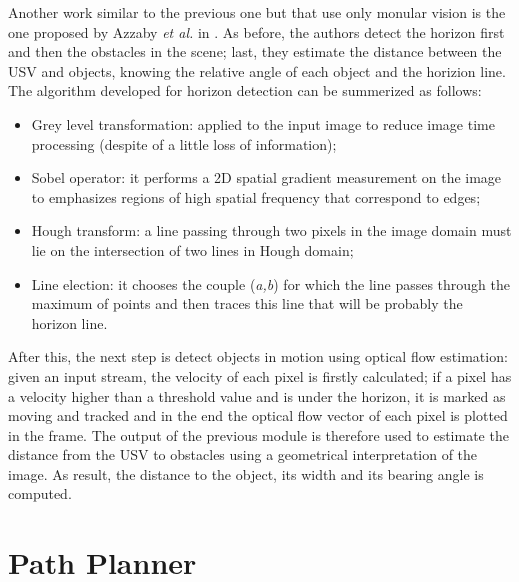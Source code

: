 \documentclass[journal]{IEEEtran}
\begin{document}
      \indent Another work similar to the previous one but that use only monular vision is the one proposed by Azzaby \textit{et al.} in \cite{Azzabi}. As before, the authors detect the horizon first and then the obstacles in the scene; last, they estimate the distance between the USV and objects, knowing the relative angle of each object and the horizion line. The algorithm developed for horizon detection can be summerized as follows:
            \begin{itemize}
                  \item Grey level transformation: applied to the input image to reduce image time processing (despite of a little loss of information);
                  \item Sobel operator: it performs a 2D spatial gradient measurement on the image to emphasizes regions of high spatial frequency that correspond to edges;
                  \item Hough transform: a line passing through two pixels in the image domain must lie on the intersection of two lines in Hough domain;
                  \item Line election: it chooses the couple (\textit{a,b}) for which the line passes through the maximum of points and then traces this line that will be probably the horizon line.
            \end{itemize}
      \indent After this, the next step is detect objects in motion using optical flow estimation: given an input stream, the velocity of each pixel is firstly calculated; if a pixel has a velocity higher than a threshold value and is under the horizon, it is marked as moving and tracked and in the end the optical flow vector of each pixel is plotted in the frame.
      \indent The output of the previous module is therefore used to estimate the distance from the USV to obstacles using a geometrical interpretation of the image. As result, the distance to the object, its width and its bearing angle is computed.

\section{Path Planner} \label{path_planner}
\end{document}
